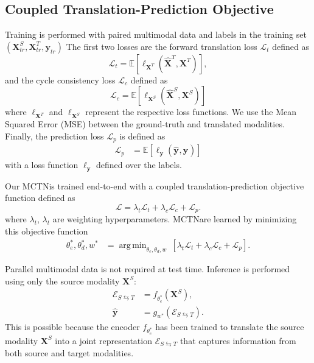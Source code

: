 \documentclass[letterpaper]{article} %
\DeclareMathOperator*{\argmin}{arg\,min}
\newcommand{\ours}{MCTN}
\begin{document}
\subsection{Coupled Translation-Prediction Objective}

Training is performed with paired multimodal data and labels in the training set $(\mathbf{X}^{S}_{tr},\mathbf{X}^{T}_{tr},\mathbf{y}_{tr})$ 
The first two losses are
the forward translation loss $\mathcal{L}_t$ defined as 
\begin{equation}
\mathcal{L}_t = \mathbb{E} [\ell_{\mathbf{X}^{T}}(\hat{\mathbf{X}}^{T}_{},{\mathbf{X}}^{T}_{})],
\label{lt}
\end{equation}
and the cycle consistency loss $\mathcal{L}_c$ defined as
\begin{equation}
\mathcal{L}_c = \mathbb{E} [\ell_{\mathbf{X}^{S}}(\hat{\mathbf{X}}^{S}_{},{\mathbf{X}}^{S}_{})]
\label{lc}
\end{equation}
where 
$\ell_{\mathbf{X}^{T}}$ and $\ell_{\mathbf{X}^{S}}$
represent the respective loss functions. 
We use the Mean Squared Error (MSE) between the ground-truth and translated modalities. Finally, the prediction loss $\mathcal{L}_p$ is defined as
\begin{align}
\mathcal{L}_p &= \mathbb{E} [ \ell_{\mathbf{y}}(\hat{\mathbf{y}}_{},\mathbf{y}_{})]
\label{lp}
\end{align}
with
a loss function $\ell_{\mathbf{y}}$ 
defined
over the labels.

Our \ours \model is trained end-to-end with a coupled translation-prediction objective function defined as 
\begin{equation}
\mathcal{L} = \lambda_t \mathcal{L}_t + \lambda_c \mathcal{L}_c + \mathcal{L}_p.
\label{eq:objective}
\end{equation}
where $\lambda_t$, $\lambda_t$ are weighting hyperparameters. \ours \parameters are learned by minimizing this objective function
\begin{align}
\theta_e^*, \theta_d^*, w^* &= \argmin_{\theta_e,\theta_d,w} \ [\lambda_t \mathcal{L}_t + \lambda_c \mathcal{L}_c + \mathcal{L}_p].
\end{align}

Parallel multimodal data is not required at test time. Inference is performed using only the source modality 
$\mathbf{X}^{S}$:
\begin{align}{\mathcal{E}}_{S \leftrightarrows T} &= f_{\theta_e^*}
(\mathbf{X}^{S}), \\
\hat{\mathbf{y}} 
&= g_{w^*}({\mathcal{E}}_{S \leftrightarrows T}).
\end{align}
This is possible because the encoder $f_{\theta_e^*}$ has been trained to translate the source modality $\mathbf{X}^{S}$ into a joint representation ${\mathcal{E}}_{S \leftrightarrows T}$ that captures information from both source and target modalities. 
\end{document}
